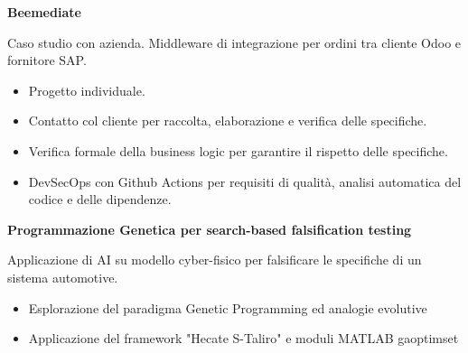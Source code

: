 \documentclass[a4paper]{letter}
\begin{document}
\begin{minipage}[t]{0.65\textwidth}
\vspace{1 mm}
{\large \textbf{Beemediate}}

{\small Caso studio con azienda. Middleware di integrazione per ordini tra cliente Odoo e fornitore SAP.}

\vspace{1 mm}
\begin{itemize}
    \item Progetto individuale.
    \item Contatto col cliente per raccolta, elaborazione e verifica delle specifiche.
    \item Verifica formale della business logic per garantire il rispetto delle specifiche.
    \item DevSecOps con Github Actions per requisiti di qualità, analisi automatica del codice e delle dipendenze.
\end{itemize}

\vspace{1 mm}
{\large \textbf{Programmazione Genetica per search-based falsification testing}}

{\small Applicazione di AI su modello cyber-fisico per falsificare le specifiche di un sistema automotive. }

\vspace{1 mm}
\begin{itemize}
    \item Esplorazione del paradigma Genetic Programming ed analogie evolutive
    \item Applicazione del framework "Hecate S-Taliro" e moduli MATLAB gaoptimset
\end{itemize}

\end{minipage}
\end{document}
